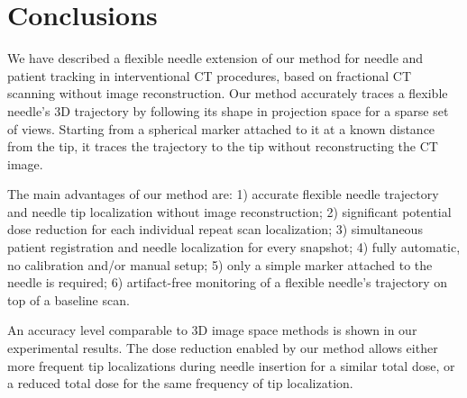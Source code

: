 \section{Conclusions}
We have described a flexible needle extension of our method for needle and patient tracking in interventional CT procedures, based on fractional CT scanning without image reconstruction.
Our method accurately traces a flexible needle's 3D trajectory by following its shape in projection space for a sparse set of views. Starting from a spherical marker attached to it at a known distance from the tip, it traces the trajectory to the tip without reconstructing the CT image.

The main advantages of our method are:
1) accurate flexible needle trajectory and needle tip localization without image reconstruction;
2) significant potential dose reduction for each individual repeat scan localization;
3) simultaneous patient registration and needle localization for every snapshot; 
4) fully automatic, no calibration and/or manual setup;
5) only a simple marker attached to the needle is required; 
6) artifact-free monitoring of a flexible needle's trajectory on top of a baseline scan.

An accuracy level comparable to 3D image space methods is shown in our experimental results.
The dose reduction enabled by our method allows either more frequent tip localizations during needle insertion for a similar total dose, or a reduced total dose for the same frequency of tip localization.








